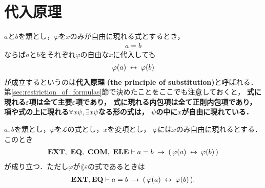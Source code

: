 \section{代入原理}
	$a$と$b$を類とし，$\varphi$を$x$のみが自由に現れる式とするとき，
	\begin{align}
		a = b
	\end{align}
	ならば$a$と$b$をそれぞれ$\varphi$の自由な$x$に代入しても
	\begin{align}
		\varphi(a) \hspace{0.25em}\leftrightarrow\hspace{0.25em} \varphi(b)
	\end{align}
	が成立するというのは{\bf 代入原理}
	{\bf (the principle of substitution)}と呼ばれる．
	第\ref{sec:restriction_of_formulas}節で決めたことをここでも注意しておくと，
	{\bf 式に現れる$\varepsilon$項は全て主要$\varepsilon$項であり，
	式に現れる内包項は全て正則内包項であり，
	項や式の上に現れる$\forall x \psi,\exists x \psi$なる形の式は，
	$\psi$の中に$x$が自由に現れている．}
	
	\begin{comment}
	
	この原理の証明は相等性公理に負うところが多いが，
	本稿では$\varepsilon$項という厄介なものを抱え込んでいるため
	$\EQAX$だけでは不十分であり，次に追加する公理が必要になる．
	
	\begin{screen}
		\begin{axm}[$\varepsilon$項に対する相等性公理]
			$a,b$を類とし，$\varphi$を$\lang{\varepsilon}$の式とし，$\varphi$には変項$x,y$が
			自由に現れ，また$\varphi$に自由に現れる変項はこれらのみであるとする．このとき
			\begin{align}
				\EQAXEP \defarrow
				a = b \rarrow \varepsilon x \varphi(x,a) = \varepsilon x \varphi(x,b).
			\end{align}
		\end{axm}
	\end{screen}
	
	\end{comment}
	
	\begin{screen}
		\begin{thm}[代入原理]\label{thm:the_principle_of_substitution}
			$a,b$を類とし，$\varphi$を$\mathcal{L}$の式とし，$x$を変項とし，
			$\varphi$には$x$のみ自由に現れるとする．このとき
			\begin{align}
				\mbox{{\bf EXT}},\ \mbox{{\bf EQ}},\ \mbox{\bf COM},\ \mbox{{\bf ELE}} \vdash a = b \hspace{0.25em}\rightarrow\hspace{0.25em} 
				(\, \varphi(a) \hspace{0.25em}\leftrightarrow\hspace{0.25em} \varphi(b)\, )
			\end{align}
			が成り立つ．ただし$\varphi$が$\lang{\varepsilon}$の式であるときは
			\begin{align}
				\mbox{{\bf EXT}},\mbox{{\bf EQ}} \vdash a = b \hspace{0.25em}\rightarrow\hspace{0.25em} 
				(\, \varphi(a) \hspace{0.25em}\leftrightarrow\hspace{0.25em} \varphi(b)\, ).
			\end{align}
		\end{thm}
	\end{screen}
	
